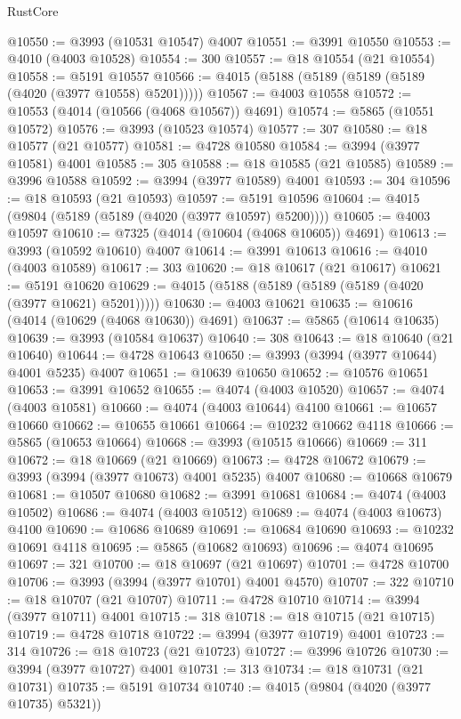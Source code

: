 \begin{lexlean}{RustCore}
\begin{coremodule}
@10550 := @3993 (@10531 @10547) @4007
@10551 := @3991 @10550
@10553 := @4010 (@4003 @10528)
@10554 := 300
@10557 := @18 @10554 (@21 @10554)
@10558 := @5191 @10557
@10566 := @4015 (@5188 (@5189 (@5189 (@5189 (@4020 (@3977 @10558) @5201)))))
@10567 := @4003 @10558
@10572 := @10553 (@4014 (@10566 (@4068 @10567)) @4691)
@10574 := @5865 (@10551 @10572)
@10576 := @3993 (@10523 @10574)
@10577 := 307
@10580 := @18 @10577 (@21 @10577)
@10581 := @4728 @10580
@10584 := @3994 (@3977 @10581) @4001
@10585 := 305
@10588 := @18 @10585 (@21 @10585)
@10589 := @3996 @10588
@10592 := @3994 (@3977 @10589) @4001
@10593 := 304
@10596 := @18 @10593 (@21 @10593)
@10597 := @5191 @10596
@10604 := @4015 (@9804 (@5189 (@5189 (@4020 (@3977 @10597) @5200))))
@10605 := @4003 @10597
@10610 := @7325 (@4014 (@10604 (@4068 @10605)) @4691)
@10613 := @3993 (@10592 @10610) @4007
@10614 := @3991 @10613
@10616 := @4010 (@4003 @10589)
@10617 := 303
@10620 := @18 @10617 (@21 @10617)
@10621 := @5191 @10620
@10629 := @4015 (@5188 (@5189 (@5189 (@5189 (@4020 (@3977 @10621) @5201)))))
@10630 := @4003 @10621
@10635 := @10616 (@4014 (@10629 (@4068 @10630)) @4691)
@10637 := @5865 (@10614 @10635)
@10639 := @3993 (@10584 @10637)
@10640 := 308
@10643 := @18 @10640 (@21 @10640)
@10644 := @4728 @10643
@10650 := @3993 (@3994 (@3977 @10644) @4001 @5235) @4007
@10651 := @10639 @10650
@10652 := @10576 @10651
@10653 := @3991 @10652
@10655 := @4074 (@4003 @10520)
@10657 := @4074 (@4003 @10581)
@10660 := @4074 (@4003 @10644) @4100
@10661 := @10657 @10660
@10662 := @10655 @10661
@10664 := @10232 @10662 @4118
@10666 := @5865 (@10653 @10664)
@10668 := @3993 (@10515 @10666)
@10669 := 311
@10672 := @18 @10669 (@21 @10669)
@10673 := @4728 @10672
@10679 := @3993 (@3994 (@3977 @10673) @4001 @5235) @4007
@10680 := @10668 @10679
@10681 := @10507 @10680
@10682 := @3991 @10681
@10684 := @4074 (@4003 @10502)
@10686 := @4074 (@4003 @10512)
@10689 := @4074 (@4003 @10673) @4100
@10690 := @10686 @10689
@10691 := @10684 @10690
@10693 := @10232 @10691 @4118
@10695 := @5865 (@10682 @10693)
@10696 := @4074 @10695
@10697 := 321
@10700 := @18 @10697 (@21 @10697)
@10701 := @4728 @10700
@10706 := @3993 (@3994 (@3977 @10701) @4001 @4570)
@10707 := 322
@10710 := @18 @10707 (@21 @10707)
@10711 := @4728 @10710
@10714 := @3994 (@3977 @10711) @4001
@10715 := 318
@10718 := @18 @10715 (@21 @10715)
@10719 := @4728 @10718
@10722 := @3994 (@3977 @10719) @4001
@10723 := 314
@10726 := @18 @10723 (@21 @10723)
@10727 := @3996 @10726
@10730 := @3994 (@3977 @10727) @4001
@10731 := 313
@10734 := @18 @10731 (@21 @10731)
@10735 := @5191 @10734
@10740 := @4015 (@9804 (@4020 (@3977 @10735) @5321))

\end{coremodule}
\end{lexlean}
